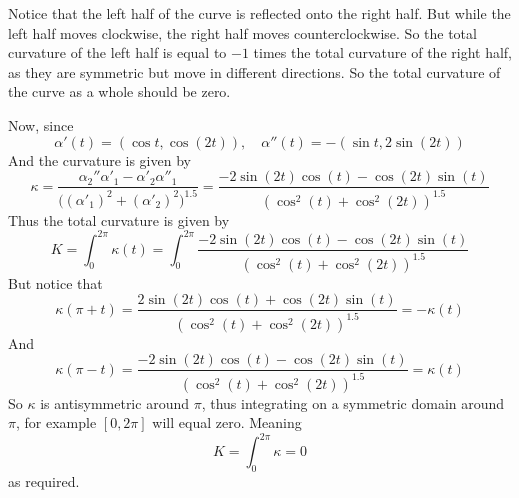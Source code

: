 \documentclass[10pt]{article}
\begin{document}
            \bgroup\centering
            \par\egroup

        \item Notice that the left half of the curve is reflected onto the right half.
            But while the left half moves clockwise, the right half moves counterclockwise.
            So the total curvature of the left half is equal to $-1$ times the total curvature of the right half, as they are symmetric but move in different directions.
            So the total curvature of the curve as a whole should be zero.

        \item Now, since
            \[ \alpha'(t) = (\cos t,\cos(2t)),\quad \alpha''(t) = -(\sin t,2\sin(2t)) \]
            And the curvature is given by
            \[ \kappa = \frac{\alpha_2''\alpha'_1 - \alpha'_2\alpha''_1}{\bigl((\alpha'_1)^2+(\alpha'_2)^2\bigr)^{1.5}} = \frac{-2\sin(2t)\cos(t)-\cos(2t)\sin(t)}{(\cos^2(t)+\cos^2(2t))^{1.5}} \]
            Thus the total curvature is given by
            \[ K = \int_0^{2\pi}\kappa(t) = \int_0^{2\pi}\frac{-2\sin(2t)\cos(t)-\cos(2t)\sin(t)}{(\cos^2(t)+\cos^2(2t))^{1.5}} \]
            But notice that
            \[ \kappa(\pi+t) = \frac{2\sin(2t)\cos(t)+\cos(2t)\sin(t)}{(\cos^2(t)+\cos^2(2t))^{1.5}} = -\kappa(t) \]
            And
            \[ \kappa(\pi-t) = \frac{-2\sin(2t)\cos(t)-\cos(2t)\sin(t)}{(\cos^2(t)+\cos^2(2t))^{1.5}} = \kappa(t) \]
            So $\kappa$ is antisymmetric around $\pi$, thus integrating on a symmetric domain around $\pi$, for example $[0,2\pi]$ will equal zero.
            Meaning
            \[ K = \int_0^{2\pi}\kappa = 0 \]
            as required.
    \eenum
\end{document}
